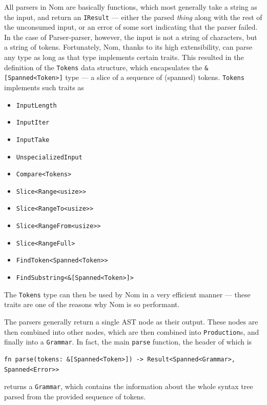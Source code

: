 \documentclass[english,engineering]{wizthesis}
\newcommand{\thisproject}{Parser-parser}
\begin{document}
All parsers in Nom are basically functions, which most generally take a string
as the input, and return an \texttt{IResult} --- either the parsed \emph{thing}
along with the rest of the unconsumed input, or an error of some sort indicating
that the parser failed. In the case of \thisproject{}, however, the input is not
a string of characters, but a string of tokens. Fortunately, Nom, thanks to its
high extensibility, can parse any type as long as that type implements certain
traits. This resulted in the definition of the \texttt{Tokens} data structure,
which encapsulates the \texttt{\&[Spanned<Token>]} type --- a slice of a sequence
of (spanned) tokens. \texttt{Tokens} implements such traits as
\begin{itemize}[noitemsep,nolistsep]
  \item \verb|InputLength|
  \item \verb|InputIter|
  \item \verb|InputTake|
  \item \verb|UnspecializedInput|
  \item \verb|Compare<Tokens>|
  \item \verb|Slice<Range<usize>>|
  \item \verb|Slice<RangeTo<usize>>|
  \item \verb|Slice<RangeFrom<usize>>|
  \item \verb|Slice<RangeFull>|
  \item \verb|FindToken<Spanned<Token>>|
  \item \verb|FindSubstring<&[Spanned<Token>]>|
\end{itemize}
The \texttt{Tokens} type can then be used by Nom in a very efficient manner ---
these traits are one of the reasons why Nom is so performant.

The parsers generally return a single AST node as their output. These nodes are
then combined into other nodes, which are then combined into
\texttt{Production}s, and finally into a \texttt{Grammar}. In fact, the main
\texttt{parse} function, the header of which is
\begin{verbatim}
fn parse(tokens: &[Spanned<Token>]) -> Result<Spanned<Grammar>, Spanned<Error>>
\end{verbatim}
returns a \texttt{Grammar}, which contains the information about the whole
syntax tree parsed from the provided sequence of tokens.
\end{document}
